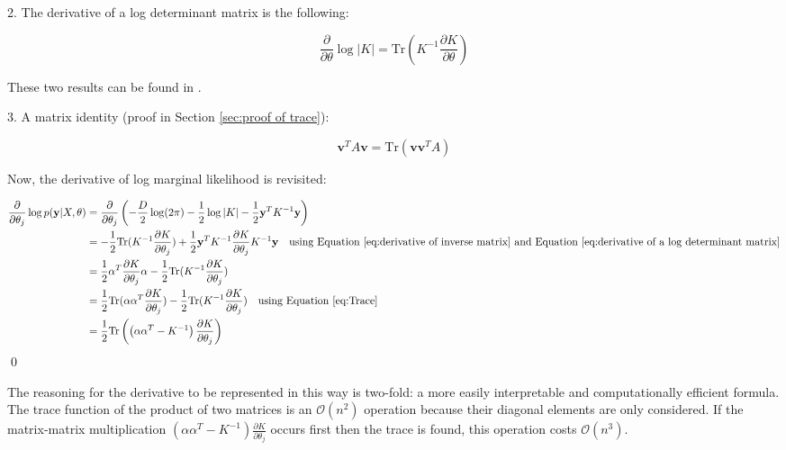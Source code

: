 \documentclass[12pt,a4paper]{article}
\begin{document}
2. The derivative of a log determinant matrix is the following:

\begin{equation}
\frac{\partial}{\partial \theta} \log |K| = \text{Tr} \left( K^{-1} \frac{\partial K}{\partial \theta} \right)
\label{eq:derivative of a log determinant matrix}
\end{equation}

These two results can be found in \citet[see A.14 and A.15]{williams2006gaussian}.

3. A matrix identity (proof in Section \ref{sec:proof of trace}): 

\begin{equation}
\mathbf{v}^T A \mathbf{v} = \text{Tr}(\mathbf{v} \mathbf{v}^T A)
\label{eq:Trace}
\end{equation}

Now, the derivative of log marginal likelihood is revisited:

\begin{align*}
\frac{\partial}{\partial \theta_j} \log p(\mathbf{y} | X, \theta) &= \frac{\partial}{\partial \theta_j}\left(-\frac{D}{2} \log(2\pi) - \frac{1}{2} \log |K| - \frac{1}{2} \mathbf{y}^T K^{-1} \mathbf{y}\right) \\
&= - \frac{1}{2} \text{Tr}(K^{-1}\frac{\partial K}{\partial \theta_j}) + \frac{1}{2} \mathbf{y}^T K^{-1} \frac{\partial K}{\partial \theta_j} K^{-1} \mathbf{y} \quad \text{using Equation \eqref{eq:derivative of inverse matrix} and Equation \eqref{eq:derivative of a log determinant matrix}} \\
&=\frac{1}{2} \mathbf{\alpha}^T \frac{\partial K}{\partial \theta_j} \mathbf{\alpha} - \frac{1}{2} \text{Tr}(K^{-1}\frac{\partial K}{\partial \theta_j}) \\
&= \frac{1}{2} \text{Tr}(\mathbf{\alpha} \mathbf{\alpha}^T \frac{\partial K}{\partial \theta_j})- \frac{1}{2} \text{Tr}(K^{-1}\frac{\partial K}{\partial \theta_j}) \quad \text{using Equation \eqref{eq:Trace}} \\
&= \frac{1}{2} \text{Tr} \left( \left( \alpha \alpha^T - K^{-1} \right) \frac{\partial K}{\partial \theta_j} \right) \\
\end{align*}
\hfill \qed

The reasoning for the derivative to be represented in this way is two-fold: a more easily interpretable and computationally efficient  formula. The trace function of the product of two matrices is an \(\mathcal{O}(n^2)\) operation because their diagonal elements are only considered. If the matrix-matrix multiplication \(\left( \alpha \alpha^T - K^{-1} \right) \frac{\partial K}{\partial \theta_j}\) occurs first then the trace is found, this operation costs \(\mathcal{O}(n^3)\).
\end{document}
